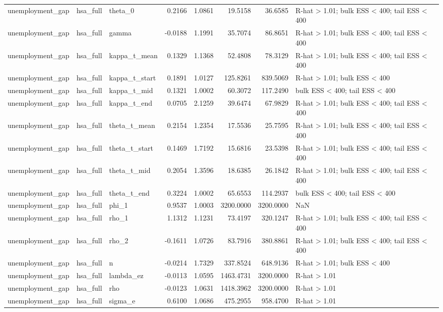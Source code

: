 \begin{tabular}{lllrrrrl}
unemployment\_gap & hsa\_full & theta\_0 & 0.2166 & 1.0861 & 19.5158 & 36.6585 & R-hat > 1.01; bulk ESS < 400; tail ESS < 400 \\
unemployment\_gap & hsa\_full & gamma & -0.0188 & 1.1991 & 35.7074 & 86.8651 & R-hat > 1.01; bulk ESS < 400; tail ESS < 400 \\
unemployment\_gap & hsa\_full & kappa\_t\_mean & 0.1329 & 1.1368 & 52.4808 & 78.3129 & R-hat > 1.01; bulk ESS < 400; tail ESS < 400 \\
unemployment\_gap & hsa\_full & kappa\_t\_start & 0.1891 & 1.0127 & 125.8261 & 839.5069 & R-hat > 1.01; bulk ESS < 400 \\
unemployment\_gap & hsa\_full & kappa\_t\_mid & 0.1321 & 1.0002 & 60.3072 & 117.2490 & bulk ESS < 400; tail ESS < 400 \\
unemployment\_gap & hsa\_full & kappa\_t\_end & 0.0705 & 2.1259 & 39.6474 & 67.9829 & R-hat > 1.01; bulk ESS < 400; tail ESS < 400 \\
unemployment\_gap & hsa\_full & theta\_t\_mean & 0.2154 & 1.2354 & 17.5536 & 25.7595 & R-hat > 1.01; bulk ESS < 400; tail ESS < 400 \\
unemployment\_gap & hsa\_full & theta\_t\_start & 0.1469 & 1.7192 & 15.6816 & 23.5398 & R-hat > 1.01; bulk ESS < 400; tail ESS < 400 \\
unemployment\_gap & hsa\_full & theta\_t\_mid & 0.2054 & 1.3596 & 18.6385 & 26.1842 & R-hat > 1.01; bulk ESS < 400; tail ESS < 400 \\
unemployment\_gap & hsa\_full & theta\_t\_end & 0.3224 & 1.0002 & 65.6553 & 114.2937 & bulk ESS < 400; tail ESS < 400 \\
unemployment\_gap & hsa\_full & phi\_1 & 0.9537 & 1.0003 & 3200.0000 & 3200.0000 & NaN \\
unemployment\_gap & hsa\_full & rho\_1 & 1.1312 & 1.1231 & 73.4197 & 320.1247 & R-hat > 1.01; bulk ESS < 400; tail ESS < 400 \\
unemployment\_gap & hsa\_full & rho\_2 & -0.1611 & 1.0726 & 83.7916 & 380.8861 & R-hat > 1.01; bulk ESS < 400; tail ESS < 400 \\
unemployment\_gap & hsa\_full & n & -0.0214 & 1.7329 & 337.8524 & 648.9136 & R-hat > 1.01; bulk ESS < 400 \\
unemployment\_gap & hsa\_full & lambda\_ez & -0.0113 & 1.0595 & 1463.4731 & 3200.0000 & R-hat > 1.01 \\
unemployment\_gap & hsa\_full & rho & -0.0123 & 1.0631 & 1418.3962 & 3200.0000 & R-hat > 1.01 \\
unemployment\_gap & hsa\_full & sigma\_e & 0.6100 & 1.0686 & 475.2955 & 958.4700 & R-hat > 1.01 \\

\end{tabular}
